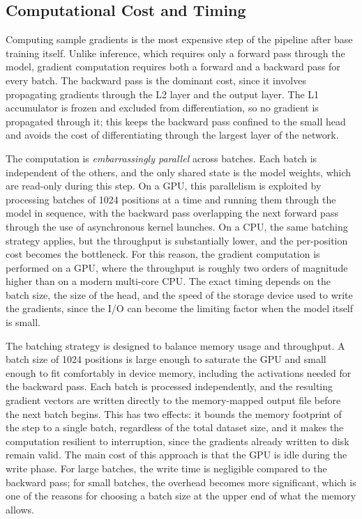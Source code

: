 \subsection{Computational Cost and Timing}\label{sec:grad-cost}

Computing sample gradients is the most expensive step of the pipeline after base training itself. Unlike inference, which requires only a forward pass through the model, gradient computation requires both a forward and a backward pass for every batch. The backward pass is the dominant cost, since it involves propagating gradients through the L2 layer and the output layer. The L1 accumulator is frozen and excluded from differentiation, so no gradient is propagated through it; this keeps the backward pass confined to the small head and avoids the cost of differentiating through the largest layer of the network.

The computation is \emph{embarrassingly parallel} across batches. Each batch is independent of the others, and the only shared state is the model weights, which are read-only during this step. On a GPU, this parallelism is exploited by processing batches of 1024 positions at a time and running them through the model in sequence, with the backward pass overlapping the next forward pass through the use of asynchronous kernel launches. On a CPU, the same batching strategy applies, but the throughput is substantially lower, and the per-position cost becomes the bottleneck. For this reason, the gradient computation is performed on a GPU, where the throughput is roughly two orders of magnitude higher than on a modern multi-core CPU. The exact timing depends on the batch size, the size of the head, and the speed of the storage device used to write the gradients, since the I/O can become the limiting factor when the model itself is small.

The batching strategy is designed to balance memory usage and throughput. A batch size of 1024 positions is large enough to saturate the GPU and small enough to fit comfortably in device memory, including the activations needed for the backward pass. Each batch is processed independently, and the resulting gradient vectors are written directly to the memory-mapped output file before the next batch begins. This has two effects: it bounds the memory footprint of the step to a single batch, regardless of the total dataset size, and it makes the computation resilient to interruption, since the gradients already written to disk remain valid. The main cost of this approach is that the GPU is idle during the write phase. For large batches, the write time is negligible compared to the backward pass; for small batches, the overhead becomes more significant, which is one of the reasons for choosing a batch size at the upper end of what the memory allows.

